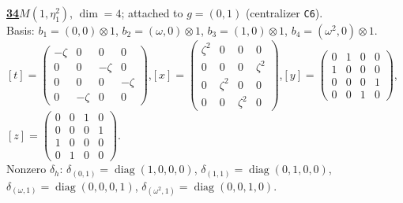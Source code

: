 \begin{samepage}\noindent\textbf{\underline{34}}\quad $M(1,\eta^{2}_{1})$, $\dim=4$; attached to $g=(0,1)$ (centralizer \texttt{C6}).\\
Basis: $b_{1}=(0,0)\otimes 1$, $b_{2}=(\omega,0)\otimes 1$, $b_{3}=(1,0)\otimes 1$, $b_{4}=(\omega^2,0)\otimes 1$.\\
$[t]=\left(\begin{smallmatrix} -\zeta & 0 & 0 & 0 \\ 0 & 0 & -\zeta & 0 \\ 0 & 0 & 0 & -\zeta \\ 0 & -\zeta & 0 & 0 \end{smallmatrix}\right)$,\quad $[x]=\left(\begin{smallmatrix} \zeta^2 & 0 & 0 & 0 \\ 0 & 0 & 0 & \zeta^2 \\ 0 & \zeta^2 & 0 & 0 \\ 0 & 0 & \zeta^2 & 0 \end{smallmatrix}\right)$,\quad $[y]=\left(\begin{smallmatrix} 0 & 1 & 0 & 0 \\ 1 & 0 & 0 & 0 \\ 0 & 0 & 0 & 1 \\ 0 & 0 & 1 & 0 \end{smallmatrix}\right)$,\quad $[z]=\left(\begin{smallmatrix} 0 & 0 & 1 & 0 \\ 0 & 0 & 0 & 1 \\ 1 & 0 & 0 & 0 \\ 0 & 1 & 0 & 0 \end{smallmatrix}\right)$.\\
Nonzero $\delta_h$: $\delta_{(0,1)}=\operatorname{diag}(1,0,0,0)$, $\delta_{(1,1)}=\operatorname{diag}(0,1,0,0)$, $\delta_{(\omega,1)}=\operatorname{diag}(0,0,0,1)$, $\delta_{(\omega^2,1)}=\operatorname{diag}(0,0,1,0)$.\end{samepage}
\medskip

